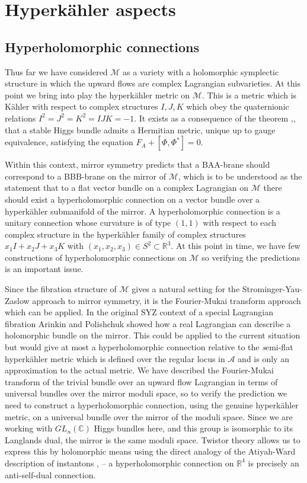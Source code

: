 \documentclass[12pt]{article}
\numberwithin{equation}{section}
\theoremstyle{remark}
\theoremstyle{definition}
\numberwithin{theorem}{section}
\def\C{\mathbb{C}}
\def\M{{\mathcal{M}}}
\def\calA{{\mathcal{A}}}
\def\R{\mathbb{R}}
\renewcommand{\1}{\mathbbm{1}}
\begin{document}
\section{Hyperk\"ahler aspects}
\label{hyper}



\subsection{Hyperholomorphic connections}

Thus far we have considered $\M$ as a variety with a holomorphic symplectic structure in which the upward flows are complex Lagrangian subvarieties. At this point we bring into play the hyperk\"ahler metric on $\M$. This is a metric which is K\"ahler with respect to complex structures $I,J,K$ which obey the quaternionic relations $I^2=J^2=K^2=IJK=-1$. It exists as a consequence of the theorem \cite{hitchin},\cite{simpson1},\cite{simpson1b} that a stable Higgs bundle admits a Hermitian metric, unique up to gauge equivalence, satisfying the equation $F_A+[\Phi,\Phi^*]=0$. 

Within this context, mirror symmetry predicts that a BAA-brane should correspond to a BBB-brane on the mirror of $\M$, which is to be understood as the statement that to a flat vector bundle on a complex Lagrangian on $\M$ there should exist a hyperholomorphic connection on a vector bundle over a hyperk\"ahler submanifold of the mirror.  A hyperholomorphic connection is a unitary connection whose curvature is of type $(1,1)$ with respect to each complex structure in the hyperk\"ahler family  of complex structures $x_1I+x_2J+x_3K$ with   $(x_1,x_2,x_3)\in S^2\subset \R^3$.  At this point in time, we have few constructions of hyperholomorphic connections on ${\mathcal M}$ so verifying the predictions is an important issue.

Since the fibration structure of $\M$ gives a natural setting for the Strominger-Yau-Zaslow approach to mirror symmetry, it is the Fourier-Mukai transform approach which can be applied. In the original SYZ context of a special Lagrangian fibration Arinkin and Polishchuk \cite{arinkin} showed how a real Lagrangian can describe a holomorphic bundle on the mirror. This could be applied to the current situation but would give at most  a hyperholomorphic connection relative to the {\emph semi-flat} hyperk\"ahler metric which is defined over the regular locus in $ \calA$ and is only an approximation to the actual metric. We have described the Fourier-Mukai transform of the trivial bundle over an upward flow Lagrangian in terms of universal bundles over the mirror moduli space, so to verify the prediction we need to construct a hyperholomorphic connection, using the genuine hyperk\"ahler metric, on a universal bundle  over the mirror of the moduli space. Since we are working with $GL_n(\C)$ Higgs bundles here, and this group is isomorphic to its Langlands dual, the mirror is the same moduli space. Twistor theory allows us to express this by holomorphic means using the direct analogy of the Atiyah-Ward description of instantons \cite{AHS}, \cite{Sal} -- a hyperholomorphic connection on $\R^4$ is precisely an  anti-self-dual connection. 
\end{document}
